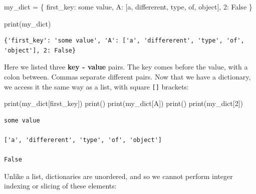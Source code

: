 \documentclass[
  letterpaper,
  DIV=11,
  numbers=noendperiod]{scrreprt}
\newenvironment{Shaded}{\begin{snugshade}}{\end{snugshade}}
\newcommand{\BuiltInTok}[1]{\textcolor[rgb]{0.00,0.23,0.31}{#1}}
\newcommand{\DecValTok}[1]{\textcolor[rgb]{0.68,0.00,0.00}{#1}}
\newcommand{\NormalTok}[1]{\textcolor[rgb]{0.00,0.23,0.31}{#1}}
\newcommand{\OperatorTok}[1]{\textcolor[rgb]{0.37,0.37,0.37}{#1}}
\newcommand{\StringTok}[1]{\textcolor[rgb]{0.13,0.47,0.30}{#1}}
\newcommand{\VariableTok}[1]{\textcolor[rgb]{0.07,0.07,0.07}{#1}}
\begin{document}
\begin{Shaded}
\begin{Highlighting}[]
\NormalTok{my\_dict }\OperatorTok{=}\NormalTok{ \{}
    \StringTok{\textquotesingle{}first\_key\textquotesingle{}}\NormalTok{: }\StringTok{\textquotesingle{}some value\textquotesingle{}}\NormalTok{,}
    \StringTok{\textquotesingle{}A\textquotesingle{}}\NormalTok{: [}\StringTok{\textquotesingle{}a\textquotesingle{}}\NormalTok{, }\StringTok{\textquotesingle{}differerent\textquotesingle{}}\NormalTok{, }\StringTok{\textquotesingle{}type\textquotesingle{}}\NormalTok{, }\StringTok{\textquotesingle{}of\textquotesingle{}}\NormalTok{, }\StringTok{\textquotesingle{}object\textquotesingle{}}\NormalTok{],}
    \DecValTok{2}\NormalTok{: }\VariableTok{False}
\NormalTok{\}}

\BuiltInTok{print}\NormalTok{(my\_dict)}
\end{Highlighting}
\end{Shaded}

\begin{verbatim}
{'first_key': 'some value', 'A': ['a', 'differerent', 'type', 'of', 'object'], 2: False}
\end{verbatim}

Here we listed three \textbf{key - value} pairs. The key comes before
the value, with a colon between. Commas separate different pairs. Now
that we have a dictionary, we access it the same way as a list, with
square \texttt{{[}{]}} brackets:

\begin{Shaded}
\begin{Highlighting}[]
\BuiltInTok{print}\NormalTok{(my\_dict[}\StringTok{\textquotesingle{}first\_key\textquotesingle{}}\NormalTok{])}
\BuiltInTok{print}\NormalTok{()}
\BuiltInTok{print}\NormalTok{(my\_dict[}\StringTok{\textquotesingle{}A\textquotesingle{}}\NormalTok{])}
\BuiltInTok{print}\NormalTok{()}
\BuiltInTok{print}\NormalTok{(my\_dict[}\DecValTok{2}\NormalTok{])}
\end{Highlighting}
\end{Shaded}

\begin{verbatim}
some value

['a', 'differerent', 'type', 'of', 'object']

False
\end{verbatim}

Unlike a list, dictionaries are unordered, and so we cannot perform
integer indexing or slicing of these elements:
\end{document}
